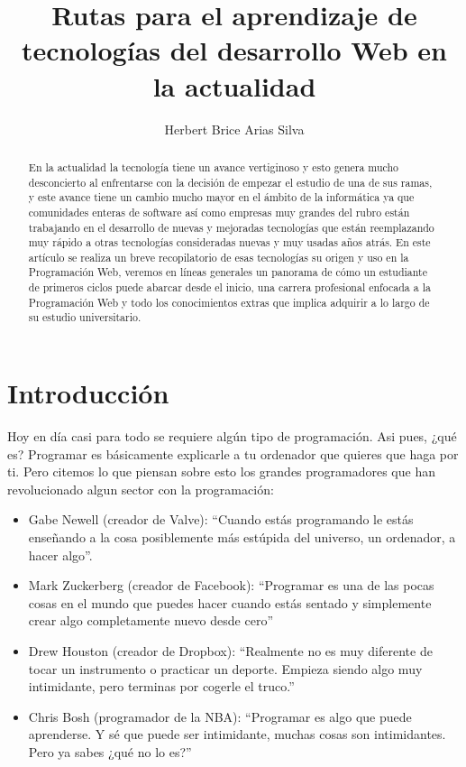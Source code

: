 \documentclass[twocolumns,a4paper]{IEEEtran}
\title{Rutas para el aprendizaje de tecnologías del desarrollo Web en la actualidad}
\author[1]{Herbert Brice Arias Silva}
\affil[1]{Departamento de Ingeniería de Software, Universidad Nacional Mayor de San Marcos}
\affil[2]{Introducción a las Ciencias e Ingeniería}
\begin{document}
\maketitle

\begin{abstract}
   En la actualidad la tecnología tiene un avance vertiginoso y esto genera
   mucho desconcierto al enfrentarse con la decisión de empezar el estudio de
   una de sus ramas, y este avance tiene un cambio mucho mayor en el ámbito de
   la informática ya que comunidades enteras de software así como empresas muy
   grandes del rubro están trabajando en el desarrollo de nuevas y mejoradas
   tecnologías que están reemplazando muy rápido a otras tecnologías
   consideradas nuevas y muy usadas años atrás. En este artículo se realiza un
   breve recopilatorio de esas tecnologías su origen y uso en la Programación
   Web, veremos en líneas generales un panorama de cómo un estudiante de
   primeros ciclos puede abarcar desde el inicio, una carrera profesional
   enfocada a la Programación Web y todo los conocimientos extras que implica
   adquirir a lo largo de su estudio universitario.
\end{abstract}

\section{Introducción}
Hoy en día casi para todo se requiere algún tipo de programación. Asi pues,
¿qué es?  Programar es básicamente explicarle a tu ordenador que quieres que
haga por ti.  Pero citemos lo que piensan sobre esto los grandes programadores
que han revolucionado algun sector con la programación:
\begin{itemize}
   \item Gabe Newell (creador de Valve): ``Cuando estás programando le estás
      enseñando a la cosa posiblemente más estúpida del universo, un ordenador,
      a hacer algo''.
   \item Mark Zuckerberg (creador de Facebook): ``Programar es una de las pocas
      cosas en el mundo que puedes hacer cuando estás sentado y simplemente
      crear algo completamente nuevo desde cero''
   \item Drew Houston (creador de Dropbox): ``Realmente no es muy diferente de
      tocar un instrumento o practicar un deporte. Empieza siendo algo muy
      intimidante, pero terminas por cogerle el truco.''
   \item Chris Bosh (programador de la NBA): ``Programar es algo que puede
      aprenderse. Y sé que puede ser intimidante, muchas cosas son
      intimidantes. Pero ya sabes ¿qué no lo es?''
\end{itemize}
\end{document}
